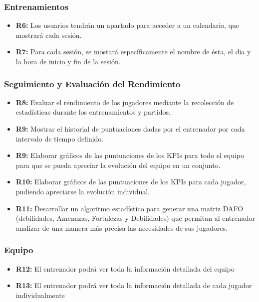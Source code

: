 \subsubsection{Entrenamientos}
\begin{itemize}
    \item \textbf{R6:} Los usuarios tendrán un apartado para acceder a un calendario, que mostrará cada sesión.
    \item \textbf{R7:} Para cada sesión, se mostará específicamente el nombre de ésta, el dia y la hora de inicio y fin de la sesión.
    
\end{itemize}

\subsubsection{Seguimiento y Evaluación del Rendimiento}
\begin{itemize}
    \item \textbf{R8:} Evaluar el rendimiento de los jugadores mediante la recolección de estadísticas durante los entrenamientos y partidos.
    
    \item \textbf{R9:} Mostrar el historial de puntuaciones dadas por el entrenador por cada intervalo de  tiempo definido.
    
    \item \textbf{R9:} Elaborar gráficos de las puntuaciones de los KPIs para todo el equipo para que se pueda apreciar la evolución del equipo en un conjunto.
    
    \item \textbf{R10:} Elaborar gráficos de las puntuaciones de los KPIs para cada jugador, pudiendo apreciarse la evolución individual.
    
    \item \textbf{R11:} Desarrollar un algoritmo estadístico para generar una matriz DAFO (debilidades, Amenazas, Fortalezas y Debilidades) que permitan al entrenador analizar de una manera más precisa las necesidades de sus jugadores.
    
\end{itemize}

\subsubsection{Equipo}
\begin{itemize}
    \item \textbf{R12:} El entrenador podrá ver toda la información detallada del equipo
    
    \item \textbf{R13:} El entrenador podrá ver toda la información detallada de cada jugador individualmente
    
\end{itemize}

